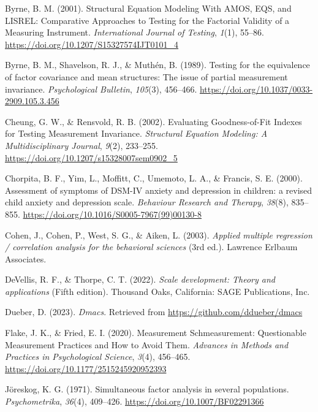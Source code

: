\documentclass[
  man]{apa6}
\newlength{\cslhangindent}
\newlength{\cslentryspacingunit} %
\newenvironment{CSLReferences}[2] %
 {%
  \setlength{\parindent}{0pt}
  \ifodd #1
  \let\oldpar\par
  \def\par{\hangindent=\cslhangindent\oldpar}
  \fi
  \setlength{\parskip}{#2\cslentryspacingunit}
 }%
 {}
\begin{document}
\begin{CSLReferences}{1}{0}
\leavevmode{}%
Byrne, B. M. (2001). Structural Equation Modeling With AMOS, EQS, and LISREL: Comparative Approaches to Testing for the Factorial Validity of a Measuring Instrument. \emph{International Journal of Testing}, \emph{1}(1), 55--86. \url{https://doi.org/10.1207/S15327574IJT0101_4}

\leavevmode{}%
Byrne, B. M., Shavelson, R. J., \& Muthén, B. (1989). Testing for the equivalence of factor covariance and mean structures: The issue of partial measurement invariance. \emph{Psychological Bulletin}, \emph{105}(3), 456--466. \url{https://doi.org/10.1037/0033-2909.105.3.456}

\leavevmode{}%
Cheung, G. W., \& Rensvold, R. B. (2002). Evaluating Goodness-of-Fit Indexes for Testing Measurement Invariance. \emph{Structural Equation Modeling: A Multidisciplinary Journal}, \emph{9}(2), 233--255. \url{https://doi.org/10.1207/s15328007sem0902_5}

\leavevmode{}%
Chorpita, B. F., Yim, L., Moffitt, C., Umemoto, L. A., \& Francis, S. E. (2000). Assessment of symptoms of DSM-IV anxiety and depression in children: a revised child anxiety and depression scale. \emph{Behaviour Research and Therapy}, \emph{38}(8), 835--855. \url{https://doi.org/10.1016/S0005-7967(99)00130-8}

\leavevmode{}%
Cohen, J., Cohen, P., West, S. G., \& Aiken, L. (2003). \emph{Applied multiple regression / correlation analysis for the behavioral sciences} (3rd ed.). Lawrence Erlbaum Associates.

\leavevmode{}%
DeVellis, R. F., \& Thorpe, C. T. (2022). \emph{Scale development: Theory and applications} (Fifth edition). Thousand Oaks, California: SAGE Publications, Inc.

\leavevmode{}%
Dueber, D. (2023). \emph{Dmacs}. Retrieved from \url{https://github.com/ddueber/dmacs}

\leavevmode{}%
Flake, J. K., \& Fried, E. I. (2020). Measurement Schmeasurement: Questionable Measurement Practices and How to Avoid Them. \emph{Advances in Methods and Practices in Psychological Science}, \emph{3}(4), 456--465. \url{https://doi.org/10.1177/2515245920952393}

\leavevmode{}%
Jöreskog, K. G. (1971). Simultaneous factor analysis in several populations. \emph{Psychometrika}, \emph{36}(4), 409--426. \url{https://doi.org/10.1007/BF02291366}


\end{CSLReferences}
\end{document}
